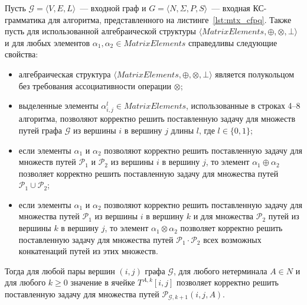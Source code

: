 \begin{lemma}\label{lemma:correct_mtx}
	Пусть $\mathcal{G} = \langle V, E, L \rangle$~--- входной граф и $G =\langle N, \Sigma, P, S \rangle$~--- входная КС-грамматика для алгоритма, представленного на листинге~\ref{lst:mtx_cfpq}. Также пусть для использованной алгебраической структуры $\langle \textit{MatrixElements}, \oplus, \otimes, \bot \rangle$ и для любых элементов $\alpha_1, \alpha_2 \in \textit{MatrixElements}$ справедливы следующие свойства:
	\begin{itemize}
	    \item алгебраическая структура $\langle \textit{MatrixElements}, \oplus, \otimes, \bot \rangle$ является полукольцом без требования ассоциативности операции $\otimes$;
	    \item выделенные элементы $\alpha^l_{i, j} \in \textit{MatrixElements}$, использованные в строках 4--8 алгоритма, позволяют корректно решить поставленную задачу для множеств путей графа $\mathcal{G}$ из вершины $i$ в вершину $j$ длины $l$, где $l \in \{0, 1\}$;
	    \item если элементы $\alpha_1$ и $\alpha_2$ позволяют корректно решить поставленную задачу для множеств путей $\mathcal{P}_1$ и $\mathcal{P}_2$ из вершины $i$ в вершину $j$, то элемент $\alpha_1 \oplus \alpha_2$ позволяет корректно решить поставленную задачу для множества путей $\mathcal{P}_1 \cup \mathcal{P}_2$;
	    \item если элементы $\alpha_1$ и $\alpha_2$ позволяют корректно решить поставленную задачу для множества путей $\mathcal{P}_1$ из вершины $i$ в вершину $k$ и для множества $\mathcal{P}_2$ путей из вершины $k$ в вершину $j$, то элемент $\alpha_1 \otimes \alpha_2$ позволяет корректно решить поставленную задачу для множества путей $\mathcal{P}_1 \cdot \mathcal{P}_2$ всех возможных конкатенаций путей из этих множеств.
	\end{itemize}
	Тогда  для любой пары вершин $(i, j)$ графа $\mathcal{G}$, для любого нетерминала $A \in N$ и для любого $k \geq 0$ значение в ячейке $T^{A, k}[i, j]$ позволяет корректно решить поставленную задачу для множества путей $\mathcal{P}_{\mathcal{G}, k + 1}(i, j, A)$.
\end{lemma}
